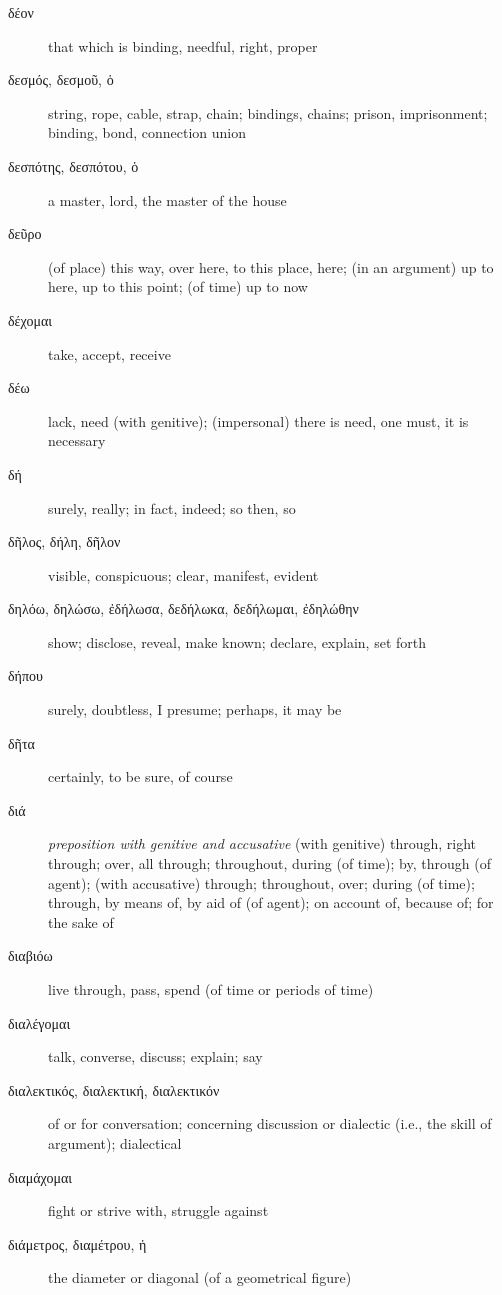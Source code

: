 \documentclass[12pt,letterpaper]{article}
\begin{document}
\begin{description}
    \item[\textgreek{δέον}] \marginnote{*}that which is binding, needful, right, proper
    \item[\textgreek{δεσμός, δεσμοῦ, ὁ}] string, rope, cable, strap, chain; bindings, chains; prison, imprisonment; binding, bond, connection union
    \item[\textgreek{δεσπότης, δεσπότου, ὁ}] a master, lord, the master of the house
    \item[\textgreek{δεῦρο}] (of place) this way, over here, to this place, here; (in an argument) up to here, up to this point; (of time) up to now
    \item[\textgreek{δέχομαι}] take, accept, receive
    \item[\textgreek{δέω}] \marginnote{*}lack, need (with genitive); (impersonal) there is need, one must, it is necessary
    \item[\textgreek{δή}] \marginnote{*}surely, really; in fact, indeed; so then, so
    \item[\textgreek{δῆλος, δήλη, δῆλον}] \marginnote{*}visible, conspicuous; clear, manifest, evident
    \item[\textgreek{δηλόω, δηλώσω, ἐδήλωσα, δεδήλωκα, δεδήλωμαι, ἐδηλώθην}] \marginnote{*}show; disclose, reveal, make known; declare, explain, set forth
    \item[\textgreek{δήπου}] surely, doubtless, I presume; perhaps, it may be
    \item[\textgreek{δῆτα}] certainly, to be sure, of course
    \item[\textgreek{διά}] \marginnote{*}\textit{preposition with genitive and accusative} (with genitive) through, right through; over, all through; throughout, during (of time); by, through (of agent); (with accusative) through; throughout, over; during (of time); through, by means of, by aid of (of agent); on account of, because of; for the sake of
    \item[\textgreek{διαβιόω}] live through, pass, spend (of time or periods of time)
    \item[\textgreek{διαλέγομαι}] talk, converse, discuss; explain; say
    \item[\textgreek{διαλεκτικός, διαλεκτική, διαλεκτικόν}] of or for conversation; concerning discussion or dialectic (i.e., the skill of argument); dialectical
    \item[\textgreek{διαμάχομαι}] fight or strive with, struggle against
    \item[\textgreek{διάμετρος, διαμέτρου, ἡ}] the diameter or diagonal (of a geometrical figure)

\end{description}
\end{document}
